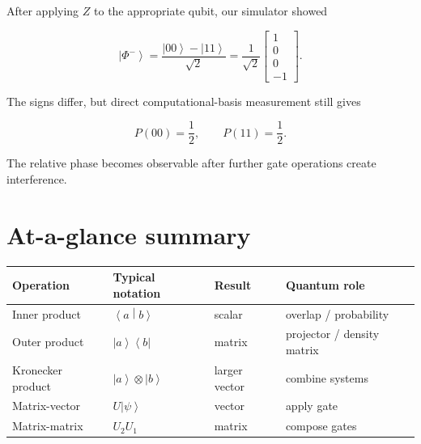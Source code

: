 \documentclass[11pt,a4paper]{article}
\newcommand{\ket}[1]{\left|#1\right\rangle}
\newcommand{\bra}[1]{\left\langle#1\right|}
\newcommand{\braket}[2]{\left\langle #1 \middle| #2 \right\rangle}
\begin{document}
After applying $Z$ to the appropriate qubit, our simulator showed

\[
\ket{\Phi^-}
=
\frac{\ket{00}-\ket{11}}{\sqrt{2}}
=
\frac{1}{\sqrt{2}}
\begin{bmatrix}
1\\0\\0\\-1
\end{bmatrix}.
\]

The signs differ, but direct computational-basis measurement still gives

\[
P(00)=\frac{1}{2},
\qquad
P(11)=\frac{1}{2}.
\]

The relative phase becomes observable after further gate operations create
interference.

\section{At-a-glance summary}

\begin{center}
\begin{tabular}{@{}llll@{}}
\toprule
Operation & Typical notation & Result & Quantum role\\
\midrule
Inner product & $\braket{a}{b}$ & scalar & overlap / probability\\
Outer product & $\ket{a}\bra{b}$ & matrix & projector / density matrix\\
Kronecker product & $\ket{a}\otimes\ket{b}$ & larger vector & combine systems\\
Matrix-vector & $U\ket{\psi}$ & vector & apply gate\\
Matrix-matrix & $U_2U_1$ & matrix & compose gates\\
\bottomrule
\end{tabular}
\end{center}
\end{document}
